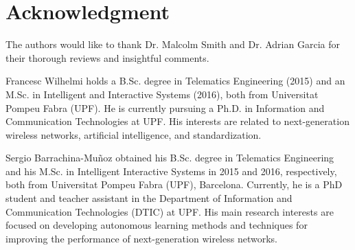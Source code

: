 \documentclass{ieeeaccess}
\begin{document}
\section*{Acknowledgment}
The authors would like to thank Dr. Malcolm Smith and Dr. Adrian Garcia for their thorough reviews and insightful comments.




\begin{IEEEbiography}{Francesc Wilhelmi} holds a B.Sc. degree in Telematics Engineering (2015) and an M.Sc. in Intelligent and Interactive Systems (2016), both from Universitat Pompeu Fabra (UPF). He is currently pursuing a Ph.D. in Information and Communication Technologies at UPF. His interests are related to next-generation wireless networks, artificial intelligence, and standardization.
\end{IEEEbiography}

\begin{IEEEbiography}{Sergio Barrachina-Mu\~noz} obtained his B.Sc. degree in Telematics Engineering and his M.Sc. in Intelligent Interactive Systems in 2015 and 2016, respectively, both from Universitat Pompeu Fabra (UPF), Barcelona. Currently, he is a PhD student and teacher assistant in the Department of Information and Communication Technologies (DTIC) at UPF. His main research interests are focused on developing autonomous learning methods and techniques for improving the performance of next-generation wireless networks.
\end{IEEEbiography}
\end{document}
